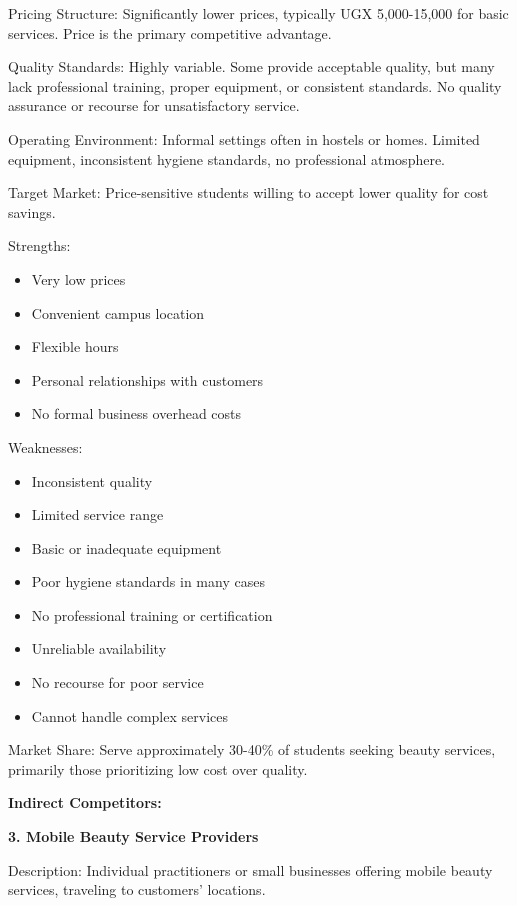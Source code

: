 Pricing Structure: Significantly lower prices, typically UGX 5,000-15,000 for basic services. Price is the primary competitive advantage.

Quality Standards: Highly variable. Some provide acceptable quality, but many lack professional training, proper equipment, or consistent standards. No quality assurance or recourse for unsatisfactory service.

Operating Environment: Informal settings often in hostels or homes. Limited equipment, inconsistent hygiene standards, no professional atmosphere.

Target Market: Price-sensitive students willing to accept lower quality for cost savings.

Strengths:
\begin{itemize}[leftmargin=2em]
    \item Very low prices
    \item Convenient campus location
    \item Flexible hours
    \item Personal relationships with customers
    \item No formal business overhead costs
\end{itemize}

Weaknesses:
\begin{itemize}[leftmargin=2em]
    \item Inconsistent quality
    \item Limited service range
    \item Basic or inadequate equipment
    \item Poor hygiene standards in many cases
    \item No professional training or certification
    \item Unreliable availability
    \item No recourse for poor service
    \item Cannot handle complex services
\end{itemize}

Market Share: Serve approximately 30-40\% of students seeking beauty services, primarily those prioritizing low cost over quality.

\textbf{Indirect Competitors:}

\textbf{3. Mobile Beauty Service Providers}

Description: Individual practitioners or small businesses offering mobile beauty services, traveling to customers' locations.

